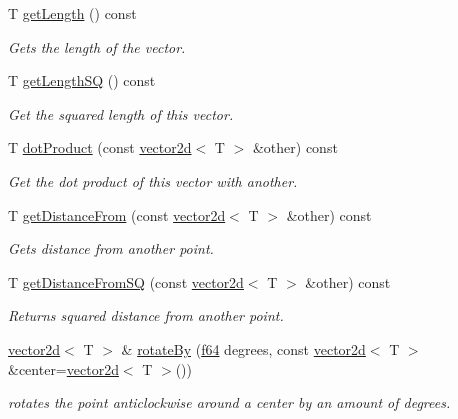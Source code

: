 \begin{DoxyCompactItemize}
\item 
T \hyperlink{classirr_1_1core_1_1vector2d_ad4c3614d12e2517223349a31632007ed}{get\+Length} () const 
\begin{DoxyCompactList}\small\item\em Gets the length of the vector. \end{DoxyCompactList}\item 
T \hyperlink{classirr_1_1core_1_1vector2d_a50d7eaeed6caf2b99bf3cf86e084c362}{get\+Length\+SQ} () const 
\begin{DoxyCompactList}\small\item\em Get the squared length of this vector. \end{DoxyCompactList}\item 
T \hyperlink{classirr_1_1core_1_1vector2d_a3899c231259a77c4aae6fec8ed72a6bc}{dot\+Product} (const \hyperlink{classirr_1_1core_1_1vector2d}{vector2d}$<$ T $>$ \&other) const 
\begin{DoxyCompactList}\small\item\em Get the dot product of this vector with another. \end{DoxyCompactList}\item 
T \hyperlink{classirr_1_1core_1_1vector2d_ae8541afbe62fe3b01e18fb04130f6d9e}{get\+Distance\+From} (const \hyperlink{classirr_1_1core_1_1vector2d}{vector2d}$<$ T $>$ \&other) const 
\begin{DoxyCompactList}\small\item\em Gets distance from another point. \end{DoxyCompactList}\item 
T \hyperlink{classirr_1_1core_1_1vector2d_a77262661ca3dcd6befea9bbc20bae4aa}{get\+Distance\+From\+SQ} (const \hyperlink{classirr_1_1core_1_1vector2d}{vector2d}$<$ T $>$ \&other) const 
\begin{DoxyCompactList}\small\item\em Returns squared distance from another point. \end{DoxyCompactList}\item 
\hyperlink{classirr_1_1core_1_1vector2d}{vector2d}$<$ T $>$ \& \hyperlink{classirr_1_1core_1_1vector2d_ac9c77997f6594d79d5daa5f6bf690ed2}{rotate\+By} (\hyperlink{namespaceirr_a1325b02603ad449f92c68fc640af9b28}{f64} degrees, const \hyperlink{classirr_1_1core_1_1vector2d}{vector2d}$<$ T $>$ \&center=\hyperlink{classirr_1_1core_1_1vector2d}{vector2d}$<$ T $>$())
\begin{DoxyCompactList}\small\item\em rotates the point anticlockwise around a center by an amount of degrees. \end{DoxyCompactList}\item 

\end{DoxyCompactItemize}

